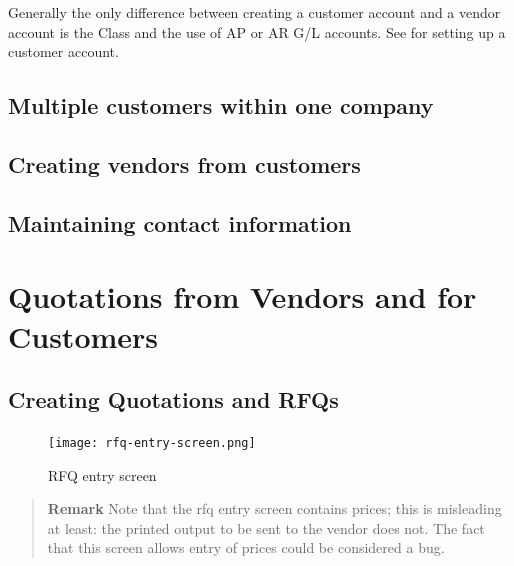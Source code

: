 Generally the only difference between creating a \gls{customer} account and a \gls{vendor} account is the Class and the use of AP or AR G/L accounts. See  for setting up a customer account.

\section{Multiple customers within one company}
\label{sec-business-processes-customer-multiple-per-company}

\section{Creating vendors from customers}
\label{sec-business-processes-customers-to-vendors}


\section{Maintaining contact information}
\label{sec-business-processes-customers-contact-information}


\chapter{Quotations from Vendors and for Customers}
\label{cha-business-processes-quotations}

\section{Creating Quotations and RFQs}
\label{sec-business-processes-quotations-creation}


\begin{figure}[h]
\centering
\texttt{[image: rfq-entry-screen.png]}
\caption{RFQ entry screen}
\label{fig:rfq-entry-screen}
\end{figure}

\begin{quote}
\textbf{Remark} Note that the \gls{rfq} entry screen contains prices; this is misleading
at least: the printed output to be sent to the vendor does not. The fact that this screen
allows entry of prices could be considered a bug.
\end{quote}

